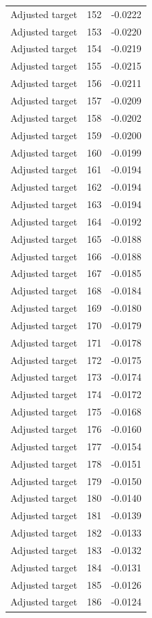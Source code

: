 \begin{table}[htbp]
\begin{tabular}{lll}
Adjusted target & 152 & -0.0222 \\
Adjusted target & 153 & -0.0220 \\
Adjusted target & 154 & -0.0219 \\
Adjusted target & 155 & -0.0215 \\
Adjusted target & 156 & -0.0211 \\
Adjusted target & 157 & -0.0209 \\
Adjusted target & 158 & -0.0202 \\
Adjusted target & 159 & -0.0200 \\
Adjusted target & 160 & -0.0199 \\
Adjusted target & 161 & -0.0194 \\
Adjusted target & 162 & -0.0194 \\
Adjusted target & 163 & -0.0194 \\
Adjusted target & 164 & -0.0192 \\
Adjusted target & 165 & -0.0188 \\
Adjusted target & 166 & -0.0188 \\
Adjusted target & 167 & -0.0185 \\
Adjusted target & 168 & -0.0184 \\
Adjusted target & 169 & -0.0180 \\
Adjusted target & 170 & -0.0179 \\
Adjusted target & 171 & -0.0178 \\
Adjusted target & 172 & -0.0175 \\
Adjusted target & 173 & -0.0174 \\
Adjusted target & 174 & -0.0172 \\
Adjusted target & 175 & -0.0168 \\
Adjusted target & 176 & -0.0160 \\
Adjusted target & 177 & -0.0154 \\
Adjusted target & 178 & -0.0151 \\
Adjusted target & 179 & -0.0150 \\
Adjusted target & 180 & -0.0140 \\
Adjusted target & 181 & -0.0139 \\
Adjusted target & 182 & -0.0133 \\
Adjusted target & 183 & -0.0132 \\
Adjusted target & 184 & -0.0131 \\
Adjusted target & 185 & -0.0126 \\
Adjusted target & 186 & -0.0124 \\

\end{tabular}
\end{table}
